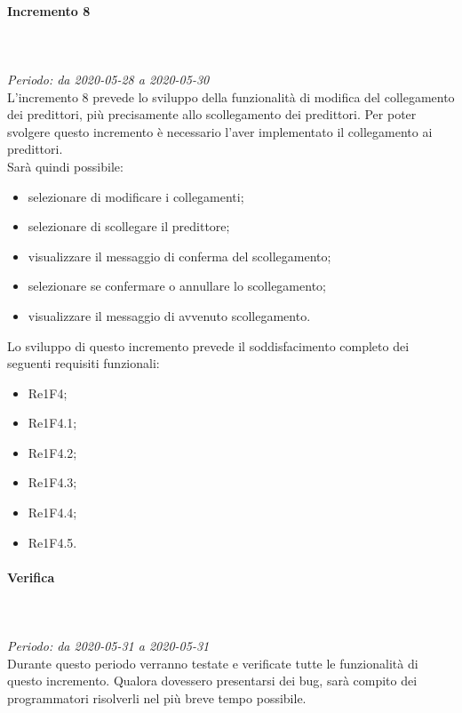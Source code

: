 \paragraph{Incremento 8}\mbox{} \\ \mbox{} \\ 
\textit{Periodo: da 2020-05-28 a 2020-05-30}\\
L’incremento 8 prevede lo sviluppo della funzionalità di modifica del collegamento dei predittori, più precisamente allo scollegamento dei predittori. Per poter svolgere questo incremento è necessario l'aver implementato il collegamento ai predittori. \\
Sarà quindi possibile:
\begin{itemize}
	\item selezionare di modificare i collegamenti;
	\item selezionare di scollegare il predittore;
	\item visualizzare il messaggio di conferma del scollegamento;
	\item selezionare se confermare o annullare lo scollegamento;
	\item visualizzare il messaggio di avvenuto scollegamento.
\end{itemize}
Lo sviluppo di questo incremento prevede il soddisfacimento completo dei seguenti requisiti funzionali:
\begin{itemize}
\item Re1F4;
\item Re1F4.1;
\item Re1F4.2;
\item Re1F4.3;
\item Re1F4.4;
\item Re1F4.5.
\end{itemize}
\paragraph*{Verifica}\mbox{} \\ \mbox{} \\ 
\textit{Periodo: da 2020-05-31 a 2020-05-31}\\
Durante questo periodo verranno testate e verificate tutte le funzionalità di questo incremento. Qualora dovessero presentarsi dei bug, sarà compito dei programmatori risolverli nel più breve tempo possibile.

